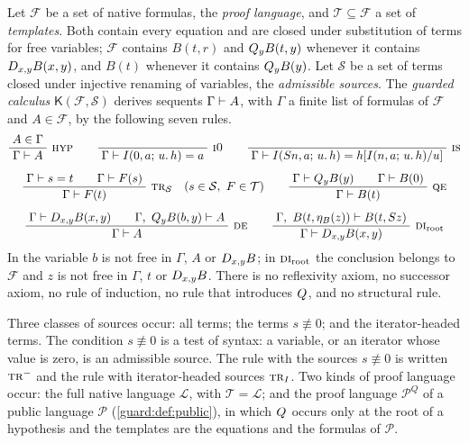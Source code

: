 \begin{definition}
\label{guard:def:calculus}
Let $\mathcal F$ be a set of native formulas, the \emph{proof language}, and
$\mathcal T\subseteq\mathcal F$ a set of \emph{templates}.  Both contain
every equation and are closed under substitution of terms for free
variables; $\mathcal F$ contains $B(t,r)$ and $Q_{y}B(t,y)$ whenever it
contains $D_{x,y}B(x,y)$, and $B(t)$ whenever it contains $Q_{y}B(y)$.  Let
$\mathcal S$ be a set of terms closed under injective renaming of variables,
the \emph{admissible sources}.  The \emph{guarded calculus}
$\mathsf K(\mathcal F,\mathcal S)$ derives sequents $\Gamma\vdash A$, with
$\Gamma$ a finite list of formulas of $\mathcal F$ and $A\in\mathcal F$, by
the following seven rules.
\begin{gather*}
 \infrule{A\in\Gamma}{\Gamma\proves A}\ \rulename{Hyp}
 \qquad
 \infrule{}{\Gamma\proves\It{0}{a}{u}{h}=a}\ \rulename{I0}
 \qquad
 \infrule{}{\Gamma\proves\It{\Suc n}{a}{u}{h}=h\subst{\It{n}{a}{u}{h}}{u}}\
 \rulename{IS}
 \\[1.2ex]
 \infrule{\Gamma\proves s=t\qquad\Gamma\proves F(s)}
         {\Gamma\proves F(t)}\ \rulename{Tr}_{\mathcal S}
 \quad (s\in\mathcal S,\ F\in\mathcal T)
 \qquad
 \infrule{\Gamma\proves\Q{y}B(y)\qquad\Gamma\proves B(0)}
         {\Gamma\proves B(t)}\ \rulename{QE}
 \\[1.2ex]
 \infrule{\Gamma\proves\D{x}{y}B(x,y)\qquad
          \Gamma,\ \Q{y}B(b,y)\proves A}
         {\Gamma\proves A}\ \rulename{DE}
 \qquad
 \infrule{\Gamma,\ B(t,\eta_B(z))\proves B(t,\Suc z)}
         {\Gamma\proves\D{x}{y}B(x,y)}\ \rulename{DI}_{\mathrm{root}}
\end{gather*}
In  the variable $b$ is not free in $\Gamma$, $A$ or
$D_{x,y}B$; in $\rulename{DI}_{\mathrm{root}}$ the conclusion belongs to
$\mathcal F$ and $z$ is not free in $\Gamma$, $t$ or $D_{x,y}B$.  There is
no reflexivity axiom, no successor axiom, no rule of induction, no rule that
introduces $Q_{}$, and no structural rule.
\end{definition}

Three classes of sources occur: all terms; the terms $s\not\equiv 0$; and
the iterator-headed terms.  The condition $s\not\equiv 0$ is a test of
syntax: a variable, or an iterator whose value is zero, is an admissible
source.  The rule with the sources $s\not\equiv 0$ is written
$\rulename{Tr}^{-}$ and the rule with iterator-headed sources
$\rulename{Tr}_I$.  Two kinds of proof language occur: the full native
language $\mathcal L$, with $\mathcal T=\mathcal L$; and the proof language
$\mathcal P^{Q}$ of a public language $\mathcal P$
(\cref{guard:def:public}), in which $Q_{}$ occurs only at the root of a
hypothesis and the templates are the equations and the formulas of
$\mathcal P$.

